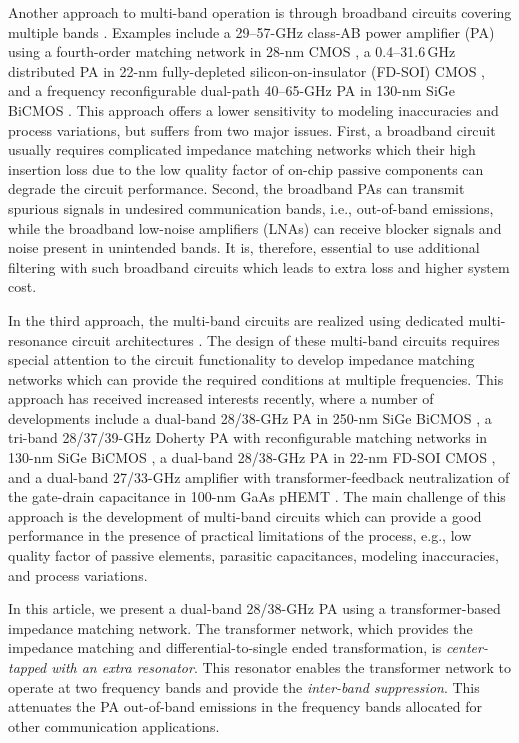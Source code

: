 \documentclass{IEEEtran}
\begin{document}
Another approach to multi-band operation is through broadband circuits covering multiple bands \cite{celik-jssc2021, vigilante-jssc2018, chappidi2017frequency, mayeda2020highly}. Examples include a 29--57-GHz class-AB power amplifier (PA) using a fourth-order matching network in 28-nm CMOS \cite{vigilante-jssc2018}, a 0.4--31.6\,GHz distributed PA in 22-nm fully-depleted silicon-on-insulator (FD-SOI) CMOS \cite{celik-jssc2021}, and a frequency reconfigurable dual-path 40--65-GHz PA in 130-nm SiGe BiCMOS \cite{chappidi2017frequency}. This approach offers a lower sensitivity to modeling inaccuracies and process variations, but suffers from two major issues. First, a broadband circuit usually requires complicated impedance matching networks which their high insertion loss due to the low quality factor of on-chip passive components can degrade the circuit performance. Second, the broadband PAs can transmit spurious signals in undesired communication bands, i.e., out-of-band emissions, while the broadband low-noise amplifiers (LNAs) can receive blocker signals and noise present in unintended bands. It is, therefore, essential to use additional filtering with such broadband circuits which leads to extra loss and higher system cost. 

In the third approach, the multi-band circuits are realized using dedicated multi-resonance circuit architectures \cite{hashemi-tmtt2002, nikandish2016, hu201928, ding202228, xu202128, lee2021millimeter, nikandish2014}. The design of these multi-band circuits requires special attention to the circuit functionality to develop impedance matching networks which can provide the required conditions at multiple frequencies. This approach has received increased interests recently, where a number of developments include a dual-band 28/38-GHz PA in 250-nm SiGe BiCMOS \cite{ding202228}, a tri-band 28/37/39-GHz Doherty PA with reconfigurable matching networks in 130-nm SiGe BiCMOS \cite{hu201928}, a dual-band 28/38-GHz PA in 22-nm FD-SOI CMOS \cite{xu202128}, and a dual-band 27/33-GHz amplifier with transformer-feedback neutralization of the gate-drain capacitance in 100-nm GaAs pHEMT \cite{nikandish2016}. The main challenge of this approach is the development of multi-band circuits which can provide a good performance in the presence of practical limitations of the process, e.g., low quality factor of passive elements, parasitic capacitances, modeling inaccuracies, and process variations. 


In this article, we present a dual-band 28/38-GHz PA using a transformer-based impedance matching network. The transformer network, which provides the impedance matching and differential-to-single ended transformation, is \textit{center-tapped with an extra resonator}. This resonator enables the transformer network to operate at two frequency bands and provide the \textit{inter-band suppression}. This attenuates the PA out-of-band emissions in the frequency bands allocated for other communication applications. 
\end{document}
